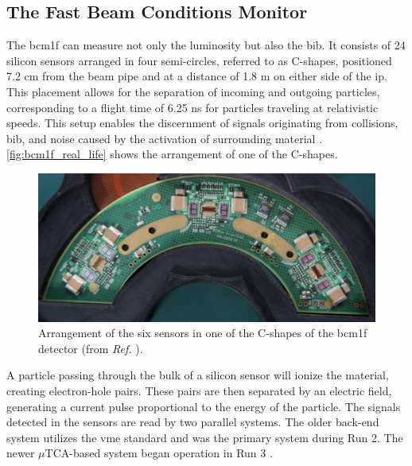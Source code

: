 \subsection{The Fast Beam Conditions Monitor}

The \acrfull{bcm1f} \cite{CMS-DP-2022-033} can measure not only the luminosity but also the \acrshort{bib}. It consists of 24 silicon sensors arranged in four semi-circles, referred to as C-shapes, positioned 7.2 cm from the beam pipe and at a distance of 1.8 m on either side of the \acrshort{ip}. This placement allows for the separation of incoming and outgoing particles, corresponding to a flight time of 6.25 ns for particles traveling at relativistic speeds. This setup enables the discernment of signals originating from collisions, \acrshort{bib}, and noise caused by the activation of surrounding material \cite{Zagozdzinska_2016}. \autoref{fig:bcm1f_real_life} shows the arrangement of one of the C-shapes.

\begin{figure}[h]
\centering
\includegraphics[width=\textwidth]{images/assets/bcm1f_real_life.png}
\caption[BCM1F sensor arrangement]{Arrangement of the six sensors in one of the C-shapes of the \acrshort{bcm1f} detector (from \textit{Ref.} \cite{DelannoySotomayor:2809025}).}
\label{fig:bcm1f_real_life}
\end{figure}


A particle passing through the bulk of a silicon sensor will ionize the material, creating electron-hole pairs. These pairs are then separated by an electric field, generating a current pulse proportional to the energy of the particle. The signals detected in the sensors are read by two parallel systems. The older back-end system utilizes the \acrfull{vme} standard and was the primary system during Run 2. The newer $\mu$TCA-based system began operation in Run 3 \cite{Karacheban:2294183}.

